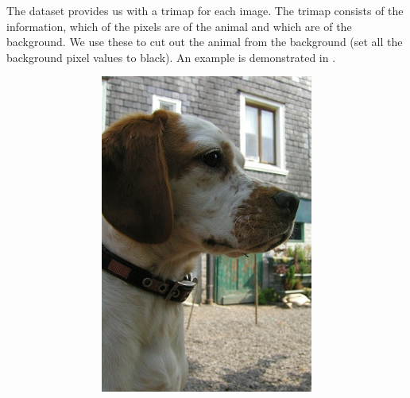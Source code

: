 The dataset provides us with a trimap for each image. The trimap consists of the information, which of the pixels are of the animal and which are of the background. We use these to cut out the animal from the background (set all the background pixel values to black). An example is demonstrated in .
\begin{figure}[!ht]
    \centering
    \begin{subfigure}{0.55\textwidth}
        \begin{subfigure}[t]{0.40\textwidth}
            \includegraphics[width=\textwidth]{Figures/datasets/beagele.jpg}
            \label{fig:original:example}
        \end{subfigure}\hfill
        \begin{subfigure}[t]{0.40\textwidth}

\end{subfigure}
\end{subfigure}
\end{figure}
